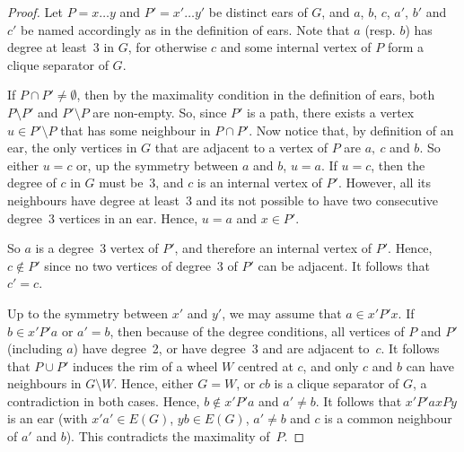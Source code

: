 \documentclass[11pt]{article}
\newcommand{\sm}{\setminus}
\begin{document}
\begin{proof}
  Let $P = x\dots y$  and $P' = x'\dots y'$ be distinct ears of $G$, and $a$, $b$, $c$, $a'$, $b'$ and $c'$ be named accordingly as in the definition of ears. Note that $a$ (resp. $b$) has degree at least~3 in $G$, for otherwise $c$ and some internal vertex of $P$ form a clique separator of $G$.
  
  If $P\cap P'\neq \emptyset$, then by the maximality condition in the definition of ears, both $P\sm P'$ and $P'\sm P$ are non-empty. So, since $P'$ is a path, there exists a vertex $u\in P'\sm P$ that has some neighbour in $P\cap P'$. Now notice that, by definition of an ear, the only vertices in $G$ that are adjacent to a vertex of $P$ are $a,~c$ and $b$. So either $u=c$ or, up the symmetry between $a$ and $b$, $u=a$. If $u=c$, then the degree of $c$ in $G$ must be~3, and $c$ is an internal vertex of $P'$. However, all its neighbours have degree at least~3 and its not possible to have two consecutive degree~3 vertices in an ear.
  Hence, $u=a$ and $x\in P'$.
  
  So $a$ is a degree~3 vertex of $P'$, and therefore an internal vertex of $P'$.  Hence, $c\notin P'$ since no two vertices of degree~3 of $P'$ can be adjacent. It follows that $c'=c$.  
  
  Up to the symmetry between $x'$ and $y'$, we may assume that $a \in x' P' x$. If $b\in x' P' a$ or $a'=b$, then because of the degree conditions, all vertices of $P$ and $P'$ (including $a$) have degree~2, or have degree~3 and are adjacent to~$c$.  
  It follows that $P\cup P'$ induces the rim of a wheel $W$ centred at $c$, and only $c$ and $b$ can have neighbours in  $G\sm W$.  
  Hence, either $G=W$, or $cb$ is a clique separator of $G$, a contradiction in both cases.  
  Hence, $b\notin x' P' a$ and $a'\neq b$.  
  It follows that $x'P'a xPy$ is an ear (with $x'a'\in E(G)$, $yb\in E(G)$, $a'\neq b$ and $c$ is a common neighbour of $a'$ and $b$).  
  This contradicts the maximality of~$P$.
\end{proof}
\end{document}

